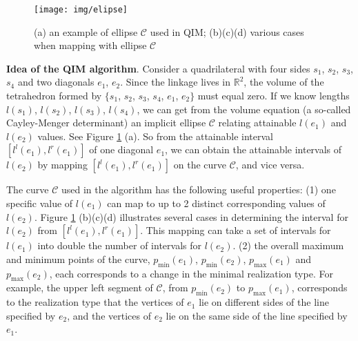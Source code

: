 \documentclass[secthm,amsthm,english]{article}
\theoremstyle{definition}
\theoremstyle{remark}
\begin{document}
\begin{figure}[h]
		
		
	 
	 
	 
	 
	     
	
	\begin{centering}
	{\tiny \texttt{[image: img/elipse]} }
	\par\end{centering}{\tiny \par}
	
	\caption{ (a) an example of ellipse $\mathcal{C}$ used in QIM; (b)(c)(d) various cases when mapping with ellipse $\mathcal{C}$}
	

\label{F:ellipse} 
\end{figure}

\noindent \textbf{Idea of the QIM algorithm}. 
Consider a quadrilateral with four sides $s_{1}$, $s_2$, $s_3$, $s_{4}$ and two diagonals $e_1$, $e_2$. 
Since the linkage lives in $\mathbb{R}^2$, 
the volume of the tetrahedron formed by $\{s_{1}$, $s_2$, $s_3$, $s_{4}$, $e_1$, $e_2\}$ must equal zero. 
If we know lengths $l(s_{1})$, $l(s_2)$, $l(s_3)$, $l(s_4)$, 
we can get from the volume equation (a so-called Cayley-Menger determinant) 
an implicit ellipse $\mathcal{C}$ relating attainable $l(e_1)$ and $l(e_2)$ values. 
See Figure \ref{F:ellipse} (a). 
So from the attainable interval $[l^{l}(e_1),l^{r}(e_1)]$ of one diagonal $e_1$, 
we can obtain the attainable intervals of $l(e_2)$ by mapping $[l^{l}(e_1),l^{r}(e_1)]$ on the curve $\mathcal{C}$, and vice versa. 

The curve $\mathcal{C}$ used in the algorithm has the following useful properties: 
(1) one specific value of $l(e_1)$ 
can map to up to 2 distinct corresponding values of $l(e_2)$.
Figure \ref{F:ellipse} (b)(c)(d) illustrates several cases in determining
the interval for $l(e_2)$ from $[l^{l}(e_1),l^{r}(e_1)]$.
This mapping can take a set of intervals for $l(e_1)$ into double the number of intervals for $l(e_2)$. 
(2) the overall maximum and minimum points of the curve, $p_{\min}(e_1)$, $p_{\min}(e_2)$, $p_{\max}(e_1)$ and $p_{\max}(e_2)$, each corresponds to a change in the minimal realization type. 
For example, the upper
left segment of $\mathcal{C}$, from $p_{\min}(e_2)$ to $p_{\max}(e_1)$,
corresponds to the realization type that the vertices of $e_1$ lie on different sides of the line specified by $e_2$, 
and the vertices of $e_2$ lie on the same side of the line specified by $e_1$. 
\end{document}
